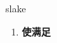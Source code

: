
\begin{frame}
{\huge slake}
\begin{center}
\begin{enumerate}\Large
  \item \textbf{使满足}
\end{enumerate}
\end{center}
\end{frame}
